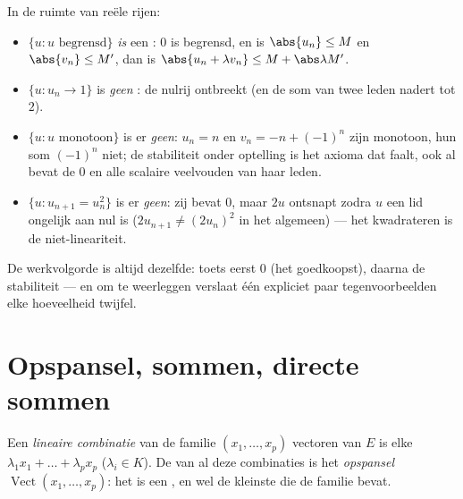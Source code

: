 \begin{example}
\label{ex:b1:vspaces:subspaceornot}
In de ruimte van reële rijen:
\begin{itemize}
  \item $\{u : u \text{ begrensd}\}$ \emph{is} een : $0$
        is begrensd, en is $\abs{u_n} \leq M$ en $\abs{v_n} \leq
        M'$, dan is $\abs{u_n + \lambda v_n} \leq M + \abs\lambda
        M'$.
  \item $\{u : u_n \to 1\}$ is \emph{geen} : de nulrij
        ontbreekt (en de som van twee leden nadert tot $2$).
  \item $\{u : u \text{ monotoon}\}$ is er \emph{geen}: $u_n = n$
        en $v_n = -n + (-1)^n$ zijn monotoon, hun som $(-1)^n$
        niet; de stabiliteit onder optelling is het axioma dat
        faalt, ook al bevat de  $0$ en alle scalaire
        veelvouden van haar leden.
  \item $\{u : u_{n+1} = u_n^2\}$ is er \emph{geen}: zij bevat $0$,
        maar $2u$ ontsnapt zodra $u$ een lid ongelijk aan nul is
        ($2u_{n+1} \neq (2u_n)^2$ in het algemeen) --- het
        kwadrateren is de niet-lineariteit.
\end{itemize}
De werkvolgorde is altijd dezelfde: toets eerst $0$ (het
goedkoopst), daarna de stabiliteit --- en om te weerleggen verslaat
één expliciet paar tegenvoorbeelden elke hoeveelheid twijfel.
\end{example}

\section{Opspansel, sommen, directe sommen}

\begin{definition}\label{def:b1:vspaces:span}
Een \emph{lineaire combinatie} van de familie $(x_1, \dots, x_p)$
vectoren van $E$ is elke $\lambda_1 x_1 + \dots + \lambda_p x_p$
($\lambda_i \in K$). De  van al deze combinaties is het
\emph{opspansel} $\operatorname{Vect}(x_1, \dots,
x_p)$: het is een , en wel de kleinste die de familie
bevat.
\end{definition}

